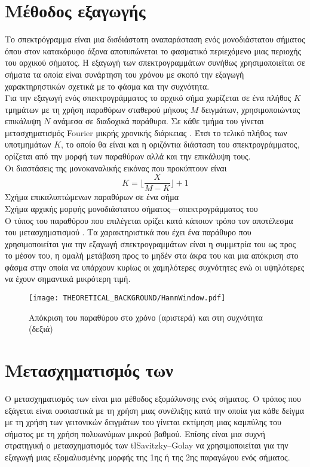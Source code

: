 \section{Μέθοδος εξαγωγής }
Το σπεκτρόγραμμα είναι μια δισδιάστατη αναπαράσταση ενός μονοδιάστατου σήματος όπου στον κατακόρυφο άξονα αποτυπώνεται το φασματικό περιεχόμενο μιας περιοχής του αρχικού σήματος. Η εξαγωγή των σπεκτρογραμμάτων συνήθως χρησιμοποιείται σε σήματα τα οποία είναι συνάρτηση του χρόνου με σκοπό την εξαγωγή χαρακτηρηστικών σχετικά με το φάσμα και την συχνότητα.\\
Για την εξαγωγή ενός σπεκτρογράμματος το αρχικό σήμα χωρίζεται σε ένα πλήθος $K$ τμημάτων με τη χρήση παραθύρων σταθερού μήκους $M$ δειγμάτων, χρησιμοποιώντας επικάλυψη $N$ ανάμεσα σε διαδοχικά παράθυρα. Σε κάθε τμήμα του γίνεται μετασχηματισμός Fourier μικρής χρονικής διάρκειας . Έτσι το τελικό πλήθος των υποτμημάτων $K$, το οποίο θα είναι και η οριζόντια διάσταση του σπεκτρογράμματος, ορίζεται από την μορφή των παραθύρων αλλά και την επικάλυψη τους.\\
Οι διαστάσεις της μονοκαναλικής εικόνας που προκύπτουν είναι 
$$K=\lfloor\frac{X}{M-K}\rfloor+1$$
Σχήμα επικαλυπτώμενων παραθύρων σε ένα σήμα\\

Σχήμα αρχικής μορφής μονοδιάστατου σήματος---σπεκτρογράμματος του\\

Ο τύπος του παραθύρου που επιλέγεται ορίζει κατά κάποιον τρόπο τον αποτέλεσμα του μετασχηματισμού . Τα χαρακτηριστικά που έχει ένα παράθυρο που χρησιμοποιείται για την εξαγωγή σπεκτρογραμμάτων είναι η συμμετρία του ως προς το μέσον του, η ομαλή μετάβαση προς το μηδέν στα άκρα του και μια απόκριση στο φάσμα στην οποία να υπάρχουν κυρίως οι χαμηλότερες συχνότητες ενώ οι υψηλότερες να έχουν σημαντικά μικρότερη τιμή.

\begin{figure}[H]
  \begin{center}
    \texttt{[image: THEORETICAL\_BACKGROUND/HannWindow.pdf]}
    \caption{Απόκριση του παραθύρου  στο χρόνο (αριστερά) και στη συχνότητα (δεξιά)}
  \end{center}
\end{figure}

\section{Μετασχηματισμός των }
Ο μετασχηματισμός των \cite{savitzky_golay} είναι μια μέθοδος εξομάλυνσης ενός σήματος. Ο τρόπος που εξάγεται είναι ουσιαστικά με τη χρήση μιας συνέλιξης κατά την οποία για κάθε δείγμα με τη χρήση των γειτονικών δειγμάτων του γίνεται εκτίμηση μιας καμπύλης του σήματος με τη χρήση πολυωνύμων μικρού βαθμού. Επίσης είναι μια συχνή στρατηγική ο μετασχηματισμός των tl{Savitzky--Golay} να χρησιμοποιείται για την εξαγωγή μιας εξομαλυσμένης μορφής της 1ης ή της 2ης παραγώγου ενός σήματος.\\

